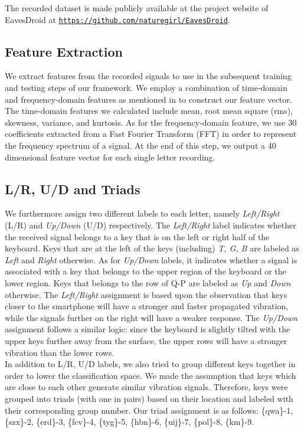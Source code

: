 \documentclass[11pt,conference]{IEEEtran}
\begin{document}
The recorded dataset is made publicly available at the project website of EavesDroid at \texttt{\url{https://github.com/naturegirl/EavesDroid}}.

\subsection{Feature Extraction}
\label{sec:feature-extractor}
We extract features from the recorded signals to use in the subsequent training and testing steps of our framework. We employ a combination of time-domain and frequency-domain features as mentioned in \cite{spiphone} to construct our feature vector. The time-domain features we calculated include mean, root mean square (rms), skewness, variance, and kurtosis. As for the frequency-domain feature, we use 30 coefficients extracted from a Fast Fourier Transform (FFT) in order to represent the frequency spectrum of a signal. At the end of this step, we output a 40 dimensional feature vector for each single letter recording.

\subsection{L/R, U/D and Triads}
\label{sec:labeler}
We furthermore assign two different labels to each letter, namely \emph{Left/Right} (L/R) and \emph{Up/Down} (U/D) respectively. The \emph{Left/Right} label indicates whether the received signal belongs to a key that is on the left or right half of the keyboard. Keys that are at the left of the keys (including) \emph{T, G, B} are labeled as \emph{Left} and \emph{Right} otherwise. As for \emph{Up/Down} labels, it indicates whether a signal is associated with a key that belongs to the upper region of the keyboard or the lower region. Keys that belongs to the row of Q-P are labeled as \emph{Up} and \emph{Down} otherwise. The \emph{Left/Right} assignment is based upon the observation that keys closer to the smartphone will have a stronger and faster propagated vibration, while the signals further on the right will have a weaker response. The \emph{Up/Down} assignment follows a similar logic: since the keyboard is slightly tilted with the upper keys further away from the surface, the upper rows will have a stronger vibration than the lower rows.\\

In addition to L/R, U/D labels, we also tried to group different keys together in order to lower the classification space. We made the assumption that keys which are close to each other generate similar vibration signals. Therefore, keys were grouped into triads (with one in pairs) based on their location and labeled with their corresponding group number.
Our triad assignment is as follows:
\{qwa\}-1, \{szx\}-2, \{erd\}-3, \{fcv\}-4, \{tyg\}-5, \{hbn\}-6, \{uij\}-7, \{pol\}-8, \{km\}-9.
\end{document}
